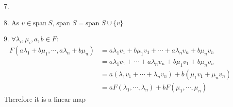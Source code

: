 \documentclass{article}
\begin{document}
\begin{itemize}
\begin{itemize}
\end{itemize}
    \item [7.] 
    \item [8.] As \(v\in \text{span}  \ S\), \(\text{span } S = \text{span }S\cup \{v\}\)
    \item [9.] \(\forall \lambda_i,\mu_i,a,b\in F\):
    \begin{align*}
        F(a\lambda_1+b\mu_1,\cdots,a\lambda_n+b\mu_n)&=a\lambda_1v_1+b\mu_1v_1+\cdots+a\lambda_nv_n+b\mu_nv_n\\
        &=a\lambda_1v_1+\cdots+a\lambda_nv_n + b\mu_1v_1+b\mu_nv_n\\
        &=a(\lambda_1v_1+\cdots+\lambda_nv_n) + b(\mu_1v_1+\mu_nv_n)\\
        &=aF(\lambda_1,\cdots,\lambda_n) + bF(\mu_1,\cdots,\mu_n)
    \end{align*}
    Therefore it is a linear map
\end{itemize}
\end{document}
